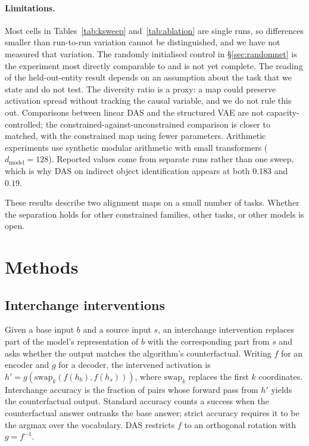\documentclass[11pt]{article}
\begin{document}
\paragraph{Limitations.}
Most cells in Tables~\ref{tab:ksweep} and~\ref{tab:ablation} are single runs, so
differences smaller than run-to-run variation cannot be distinguished, and we
have not measured that variation. The randomly initialised control in
\S\ref{sec:randomnet} is the experiment most directly comparable to
\citet{sutter2025nonlinear} and is not yet complete. The reading of the
held-out-entity result depends on an assumption about the task that we state and
do not test. The diversity ratio is a proxy: a map could preserve activation
spread without tracking the causal variable, and we do not rule this out.
Comparisons between linear DAS and the structured VAE are not capacity-controlled;
the constrained-against-unconstrained comparison is closer to matched, with the
constrained map using fewer parameters. Arithmetic experiments use synthetic
modular arithmetic with small transformers ($d_\text{model} = 128$). Reported
values come from separate runs rather than one sweep, which is why DAS on
indirect object identification appears at both $0.183$ and $0.19$.

These results describe two alignment maps on a small number of tasks. Whether the
separation holds for other constrained families, other tasks, or other models is
open.

\section{Methods}
\label{sec:methods}

\subsection{Interchange interventions}

Given a base input $b$ and a source input $s$, an interchange intervention
replaces part of the model's representation of $b$ with the corresponding part
from $s$ and asks whether the output matches the algorithm's counterfactual.
Writing $f$ for an encoder and $g$ for a decoder, the intervened activation is
$h' = g(\mathrm{swap}_k(f(h_b), f(h_s)))$, where $\mathrm{swap}_k$ replaces the
first $k$ coordinates. Interchange accuracy is the fraction of pairs whose
forward pass from $h'$ yields the counterfactual output. Standard accuracy counts
a success when the counterfactual answer outranks the base answer; strict
accuracy requires it to be the argmax over the vocabulary. DAS restricts $f$ to
an orthogonal rotation with $g = f^{-1}$.
\end{document}

